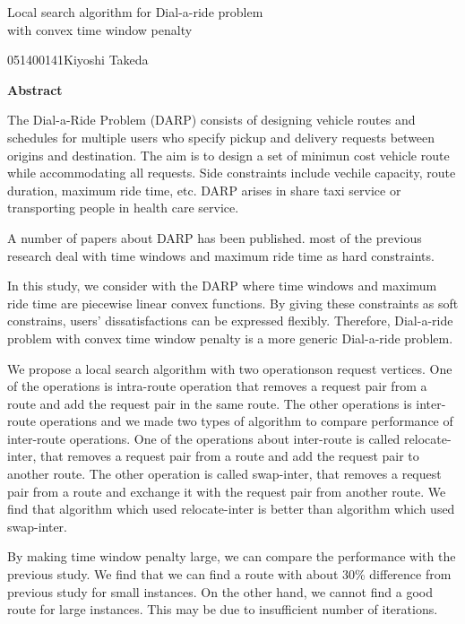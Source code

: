 

\newpage
\begin{center}{\LARGE Local  search algorithm for Dial-a-ride problem\\ with convex time window penalty}\\[0.5cm]
\end{center}
\hfill {\large 051400141\qquad Kiyoshi Takeda}\\[0.5cm]
\begin{center}
{\large \bf Abstract}\\
\end{center}
The Dial-a-Ride Problem (DARP) consists of designing vehicle routes and schedules for multiple users who specify pickup and delivery requests between origins and destination. The aim is to design a set of minimun cost vehicle route while accommodating all requests. Side constraints include vechile capacity, route duration, maximum ride time, etc. DARP arises in share taxi service or transporting people in health care service.

A number of papers about DARP has been published. most of the previous research deal with time windows and maximum ride time as hard constraints.

In this study, we consider with the DARP where time windows and maximum ride time are piecewise linear convex functions. By giving these constraints as soft constrains, users' dissatisfactions can be expressed flexibly. Therefore, Dial-a-ride problem with convex time window penalty is a more generic Dial-a-ride problem.

We propose a local search algorithm with two operationson request vertices. One of the operations is intra-route operation that removes a request pair from a route and add the request pair in the same route. The other operations is inter-route operations and we made two types of algorithm to compare performance of inter-route operations.
One of the operations about inter-route is called relocate-inter, that removes a request pair from a route and add the request pair to another route. The other operation is called swap-inter, that removes a request pair from a route and exchange it with the request pair from another route.
We find that algorithm which used relocate-inter is better than algorithm which used swap-inter.

By making time window penalty large, we can compare the performance with the previous study. We find that we can find a route with about 30\% difference from previous study for small instances. On the other hand, we cannot find a good route for large instances. This may be due to insufficient number of iterations.

